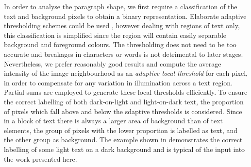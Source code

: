 In order to analyse the paragraph shape, we first require a classification of
the text and background pixels to obtain a binary representation. Elaborate
adaptive thresholding schemes could be used \cite{kittler86,sahoo88,ogorman94},
however dealing with regions of text only, this classification is simplified
since the region will contain easily separable background and foreground
colours. The thresholding does not need to be too accurate and breakages in
characters or words is not detrimental to later stages. Nevertheless, we prefer
reasonably good results and compute the average intensity of the image
neighbourhood as an {\em adaptive local threshold} for each pixel, in order to
compensate for any variation in illumination across a text region.  Partial sums
\cite{partialSums} are employed to generate these local thresholds efficiently.
To ensure the correct labelling of both dark-on-light and light-on-dark text,
the proportion of pixels which fall above and below the sdaptive thresholds is
considered.  Since in a block of text there is always a larger area of
background than of text elements, the group of pixels with the lower proportion
is labelled as text, and the other group as background.  The example shown in
 demonstrates the correct labelling of some light text on a dark
background and is typical of the input into the work presented here.


